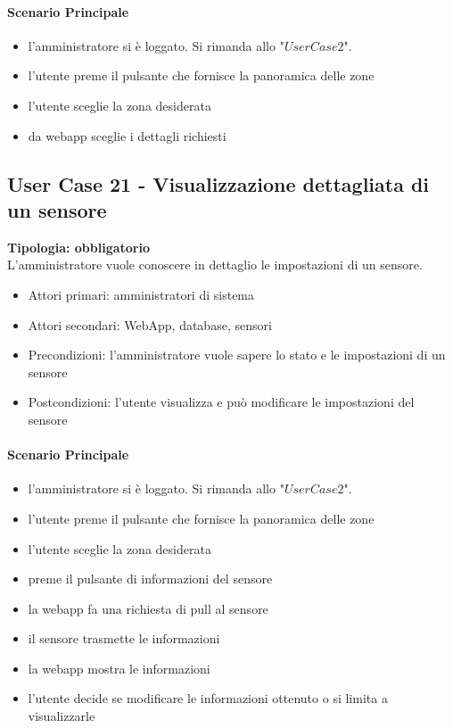 \documentclass[12pt]{article}
\begin{document}
\paragraph{Scenario Principale}
\begin{itemize}
	\item l'amministratore si è loggato. Si rimanda allo "$User Case 2$".
	\item l'utente preme il pulsante che fornisce la panoramica delle zone
	\item l'utente sceglie la zona desiderata
	\item da webapp sceglie i dettagli richiesti
\end{itemize}

\subsection{User Case 21 - Visualizzazione dettagliata di un sensore}
\textbf{Tipologia: obbligatorio} \\
L'amministratore vuole conoscere in dettaglio le impostazioni di un sensore.
\begin{itemize}
	\item Attori primari: amministratori di sistema
	\item Attori secondari: WebApp, database, sensori
	\item Precondizioni: l'amministratore vuole sapere lo stato e le impostazioni di un sensore
	\item Postcondizioni: l'utente visualizza e può modificare le impostazioni del sensore
\end{itemize}
\paragraph{Scenario Principale}
\begin{itemize}
	\item l'amministratore si è loggato. Si rimanda allo "$User Case 2$".
	\item l'utente preme il pulsante che fornisce la panoramica delle zone
	\item l'utente sceglie la zona desiderata
	\item preme il pulsante di informazioni del sensore
	\item la webapp fa una richiesta di pull al sensore
	\item il sensore trasmette le informazioni
	\item la webapp mostra le informazioni
	\item l'utente decide se modificare le informazioni ottenuto o si limita a visualizzarle
\end{itemize}
\end{document}
